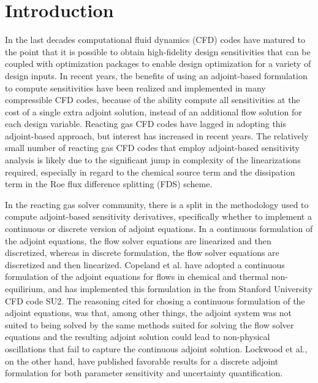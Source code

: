 \chapter{Introduction}
\label{chapter-one}

In the last decades computational fluid dynamics (CFD) codes have matured to the
point that it is possible to obtain high-fidelity design sensitivities that can
be coupled with optimization packages to enable design optimization for a
variety of design inputs\cite{baysal1992aerodynamic, balagangadhar2001design}.
In recent years, the benefits of using an adjoint-based formulation to compute
sensitivities have been realized and implemented in many compressible CFD
codes\cite{mavriplis-2006, nemec-aftosmis-adjoint, nielsen2002recent}, because
of the ability compute all sensitivities at the cost of a single extra adjoint
solution, instead of an additional flow solution for each design variable.
Reacting gas CFD codes have lagged in adopting this adjoint-based
approach, but interest has increased in recent years\cite{Copeland, Barcelona,
lockwood2010parameter}.  The relatively small number of reacting gas CFD codes
that employ adjoint-based sensitivity analysis is likely due to the significant
jump in complexity of the linearizations required, especially in regard to the
chemical source term and the dissipation term in the Roe flux difference
splitting (FDS) scheme\cite{roe}.

In the reacting gas solver community, there is a split in the methodology used
to compute adjoint-based sensitivity derivatives, specifically whether to
implement a continuous or discrete version of adjoint equations.  In a
continuous formulation of the adjoint equations, the flow solver equations are
linearized and then discretized, whereas in discrete formulation, the flow
solver equations are discretized and then linearized.  Copeland et
al.\cite{Copeland} have adopted a continuous formulation of the adjoint equations
for flows in chemical and thermal non-equilirium, and has implemented this
formulation in the from Stanford University CFD code
SU2\cite{palacios2013stanford}.  The reasoning cited for chosing a continuous
formulation of the adjoint equations, was that, among other things, the adjoint
system was not suited to being solved by the same methods suited for solving the
flow solver equations and the resulting adjoint solution could lead to
non-physical oscillations that fail to capture the continuous adjoint solution.
Lockwood et al.\cite{lockwood2010uncertainty, lockwood2010parameter}, on the
other hand, have published favorable results for a discrete adjoint formulation
for both parameter sensitivity and uncertainty quantification.

